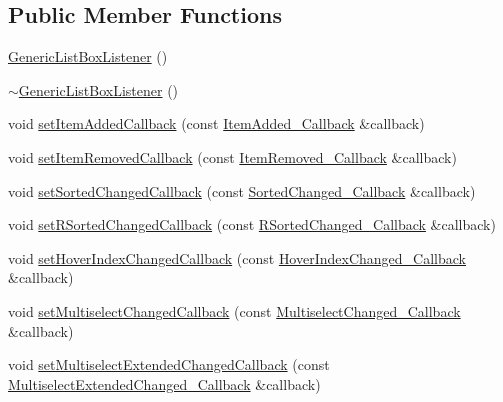\subsection*{Public Member Functions}
\begin{DoxyCompactItemize}
\item 
\mbox{\hyperlink{classec_1_1_generic_list_box_listener_a5de89e804f02f93863e2c469098cb408}{Generic\+List\+Box\+Listener}} ()
\item 
\mbox{\hyperlink{classec_1_1_generic_list_box_listener_a031efad0ba47de16334d90a80ab3d208}{$\sim$\+Generic\+List\+Box\+Listener}} ()
\item 
void \mbox{\hyperlink{classec_1_1_generic_list_box_listener_afd3c4f826d526d19f4074f4a382f1372}{set\+Item\+Added\+Callback}} (const \mbox{\hyperlink{classec_1_1_generic_list_box_listener_a9dcfd35af8971efa652ced675ac1f28d}{Item\+Added\+\_\+\+Callback}} \&callback)
\item 
void \mbox{\hyperlink{classec_1_1_generic_list_box_listener_acfa8b029e68f2c2262b2f9d7aef24237}{set\+Item\+Removed\+Callback}} (const \mbox{\hyperlink{classec_1_1_generic_list_box_listener_a7a6dd56abe801f89877e1776666a5b11}{Item\+Removed\+\_\+\+Callback}} \&callback)
\item 
void \mbox{\hyperlink{classec_1_1_generic_list_box_listener_adbce2672e6173f9f2b09d6ba9df09828}{set\+Sorted\+Changed\+Callback}} (const \mbox{\hyperlink{classec_1_1_generic_list_box_listener_a42ecf66ec6c32bbe9fe0174b2b1a527f}{Sorted\+Changed\+\_\+\+Callback}} \&callback)
\item 
void \mbox{\hyperlink{classec_1_1_generic_list_box_listener_aa8d6e9c55f6178c3fec2d9142ce9586e}{set\+R\+Sorted\+Changed\+Callback}} (const \mbox{\hyperlink{classec_1_1_generic_list_box_listener_a6e2b38bbcd32c3716e7660fc40c4054c}{R\+Sorted\+Changed\+\_\+\+Callback}} \&callback)
\item 
void \mbox{\hyperlink{classec_1_1_generic_list_box_listener_a8013f4ffb27051e6cef5eb909ced36f6}{set\+Hover\+Index\+Changed\+Callback}} (const \mbox{\hyperlink{classec_1_1_generic_list_box_listener_ac1e0c2bb89e7c14f6b201450d372722b}{Hover\+Index\+Changed\+\_\+\+Callback}} \&callback)
\item 
void \mbox{\hyperlink{classec_1_1_generic_list_box_listener_a0fa1d4e6a33ff987d555ab38c6d32044}{set\+Multiselect\+Changed\+Callback}} (const \mbox{\hyperlink{classec_1_1_generic_list_box_listener_a5016e759cd4589d9da453ce353ddc3b2}{Multiselect\+Changed\+\_\+\+Callback}} \&callback)
\item 
void \mbox{\hyperlink{classec_1_1_generic_list_box_listener_a64eba5b8be3e967ab3d6751b9fc8979a}{set\+Multiselect\+Extended\+Changed\+Callback}} (const \mbox{\hyperlink{classec_1_1_generic_list_box_listener_afafcf69d328d0d728142a5153e0b9790}{Multiselect\+Extended\+Changed\+\_\+\+Callback}} \&callback)

\end{DoxyCompactItemize}
